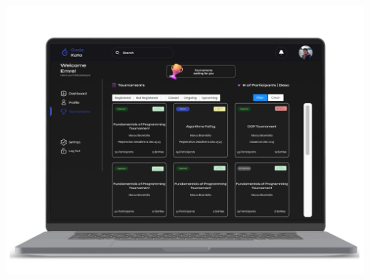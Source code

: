 \begin{center}
    \includegraphics[scale=0.13]{Images/ui-ux/student_tournaments_1.png}

\end{center}
